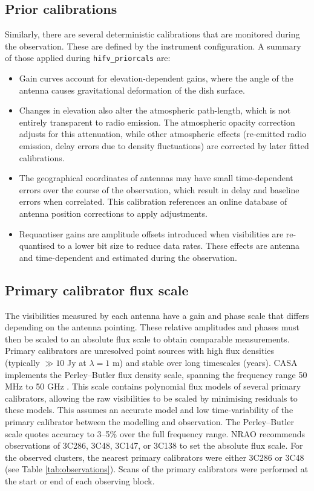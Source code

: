 \subsection{Prior calibrations}
Similarly, there are several deterministic calibrations that are monitored during the observation. These are defined by the instrument configuration. A summary of those applied during \texttt{hifv\_priorcals} are:
\begin{itemize}
    \item Gain curves account for elevation-dependent gains, where the angle of the antenna causes gravitational deformation of the dish surface.
    \item Changes in elevation also alter the atmospheric path-length, which is not entirely transparent to radio emission. The atmospheric opacity correction adjusts for this attenuation, while other atmospheric effects (re-emitted radio emission, delay errors due to density fluctuations) are corrected by later fitted calibrations.
    \item The geographical coordinates of antennas may have small time-dependent errors over the course of the observation, which result in delay and baseline errors when correlated. This calibration references an online database of antenna position corrections to apply adjustments.
    \item Requantiser gains are amplitude offsets introduced when visibilities are re-quantised to a lower bit size to reduce data rates. These effects are antenna and time-dependent and estimated during the observation.
\end{itemize}   

\subsection{Primary calibrator flux scale}
The visibilities measured by each antenna have a gain and phase scale that differs depending on the antenna pointing. These relative amplitudes and phases must then be scaled to an absolute flux scale to obtain comparable measurements. Primary calibrators are unresolved point sources with high flux densities (typically $\gg10$ Jy at $\lambda=1$ m) and stable over long timescales (years). CASA implements the Perley--Butler flux density scale, spanning the frequency range 50 MHz to 50 GHz \citep{Perley2017}. This scale contains polynomial flux models of several primary calibrators, allowing the raw visibilities to be scaled by minimising residuals to these models. This assumes an accurate model and low time-variability of the primary calibrator between the modelling and observation. The Perley--Butler scale quotes accuracy to 3--5\% over the full frequency range. NRAO recommends observations of 3C286, 3C48, 3C147, or 3C138 to set the absolute flux scale. For the observed clusters, the nearest primary calibrators were either 3C286 or 3C48 (see Table \ref{tab:observations}). Scans of the primary calibrators were performed at the start or end of each observing block. 

